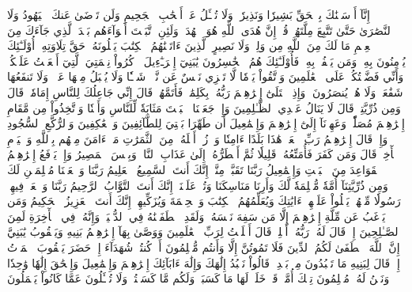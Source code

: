 إِنَّآ أَرۡسَلۡنَٰكَ بِٱلۡحَقِّ بَشِيرٗا وَنَذِيرٗاۖ وَلَا تُسۡـَٔلُ عَنۡ أَصۡحَٰبِ ٱلۡجَحِيمِ
وَلَن تَرۡضَىٰ عَنكَ ٱلۡيَهُودُ وَلَا ٱلنَّصَٰرَىٰ حَتَّىٰ تَتَّبِعَ مِلَّتَهُمۡۗ قُلۡ إِنَّ هُدَى ٱللَّهِ هُوَ ٱلۡهُدَىٰۗ وَلَئِنِ ٱتَّبَعۡتَ أَهۡوَآءَهُم بَعۡدَ ٱلَّذِي جَآءَكَ مِنَ ٱلۡعِلۡمِ مَا لَكَ مِنَ ٱللَّهِ مِن وَلِيّٖ وَلَا نَصِيرٍ
ٱلَّذِينَ ءَاتَيۡنَٰهُمُ ٱلۡكِتَٰبَ يَتۡلُونَهُۥ حَقَّ تِلَاوَتِهِۦٓ أُوْلَـٰٓئِكَ يُؤۡمِنُونَ بِهِۦۗ وَمَن يَكۡفُرۡ بِهِۦ فَأُوْلَـٰٓئِكَ هُمُ ٱلۡخَٰسِرُونَ
يَٰبَنِيٓ إِسۡرَـٰٓءِيلَ ٱذۡكُرُواْ نِعۡمَتِيَ ٱلَّتِيٓ أَنۡعَمۡتُ عَلَيۡكُمۡ وَأَنِّي فَضَّلۡتُكُمۡ عَلَى ٱلۡعَٰلَمِينَ
وَٱتَّقُواْ يَوۡمٗا لَّا تَجۡزِي نَفۡسٌ عَن نَّفۡسٖ شَيۡـٔٗا وَلَا يُقۡبَلُ مِنۡهَا عَدۡلٞ وَلَا تَنفَعُهَا شَفَٰعَةٞ وَلَا هُمۡ يُنصَرُونَ
۞وَإِذِ ٱبۡتَلَىٰٓ إِبۡرَٰهِـۧمَ رَبُّهُۥ بِكَلِمَٰتٖ فَأَتَمَّهُنَّۖ قَالَ إِنِّي جَاعِلُكَ لِلنَّاسِ إِمَامٗاۖ قَالَ وَمِن ذُرِّيَّتِيۖ قَالَ لَا يَنَالُ عَهۡدِي ٱلظَّـٰلِمِينَ
وَإِذۡ جَعَلۡنَا ٱلۡبَيۡتَ مَثَابَةٗ لِّلنَّاسِ وَأَمۡنٗا وَٱتَّخِذُواْ مِن مَّقَامِ إِبۡرَٰهِـۧمَ مُصَلّٗىۖ وَعَهِدۡنَآ إِلَىٰٓ إِبۡرَٰهِـۧمَ وَإِسۡمَٰعِيلَ أَن طَهِّرَا بَيۡتِيَ لِلطَّآئِفِينَ وَٱلۡعَٰكِفِينَ وَٱلرُّكَّعِ ٱلسُّجُودِ
وَإِذۡ قَالَ إِبۡرَٰهِـۧمُ رَبِّ ٱجۡعَلۡ هَٰذَا بَلَدًا ءَامِنٗا وَٱرۡزُقۡ أَهۡلَهُۥ مِنَ ٱلثَّمَرَٰتِ مَنۡ ءَامَنَ مِنۡهُم بِٱللَّهِ وَٱلۡيَوۡمِ ٱلۡأٓخِرِۚ قَالَ وَمَن كَفَرَ فَأُمَتِّعُهُۥ قَلِيلٗا ثُمَّ أَضۡطَرُّهُۥٓ إِلَىٰ عَذَابِ ٱلنَّارِۖ وَبِئۡسَ ٱلۡمَصِيرُ
وَإِذۡ يَرۡفَعُ إِبۡرَٰهِـۧمُ ٱلۡقَوَاعِدَ مِنَ ٱلۡبَيۡتِ وَإِسۡمَٰعِيلُ رَبَّنَا تَقَبَّلۡ مِنَّآۖ إِنَّكَ أَنتَ ٱلسَّمِيعُ ٱلۡعَلِيمُ
رَبَّنَا وَٱجۡعَلۡنَا مُسۡلِمَيۡنِ لَكَ وَمِن ذُرِّيَّتِنَآ أُمَّةٗ مُّسۡلِمَةٗ لَّكَ وَأَرِنَا مَنَاسِكَنَا وَتُبۡ عَلَيۡنَآۖ إِنَّكَ أَنتَ ٱلتَّوَّابُ ٱلرَّحِيمُ
رَبَّنَا وَٱبۡعَثۡ فِيهِمۡ رَسُولٗا مِّنۡهُمۡ يَتۡلُواْ عَلَيۡهِمۡ ءَايَٰتِكَ وَيُعَلِّمُهُمُ ٱلۡكِتَٰبَ وَٱلۡحِكۡمَةَ وَيُزَكِّيهِمۡۖ إِنَّكَ أَنتَ ٱلۡعَزِيزُ ٱلۡحَكِيمُ
وَمَن يَرۡغَبُ عَن مِّلَّةِ إِبۡرَٰهِـۧمَ إِلَّا مَن سَفِهَ نَفۡسَهُۥۚ وَلَقَدِ ٱصۡطَفَيۡنَٰهُ فِي ٱلدُّنۡيَاۖ وَإِنَّهُۥ فِي ٱلۡأٓخِرَةِ لَمِنَ ٱلصَّـٰلِحِينَ
إِذۡ قَالَ لَهُۥ رَبُّهُۥٓ أَسۡلِمۡۖ قَالَ أَسۡلَمۡتُ لِرَبِّ ٱلۡعَٰلَمِينَ
وَوَصَّىٰ بِهَآ إِبۡرَٰهِـۧمُ بَنِيهِ وَيَعۡقُوبُ يَٰبَنِيَّ إِنَّ ٱللَّهَ ٱصۡطَفَىٰ لَكُمُ ٱلدِّينَ فَلَا تَمُوتُنَّ إِلَّا وَأَنتُم مُّسۡلِمُونَ
أَمۡ كُنتُمۡ شُهَدَآءَ إِذۡ حَضَرَ يَعۡقُوبَ ٱلۡمَوۡتُ إِذۡ قَالَ لِبَنِيهِ مَا تَعۡبُدُونَ مِنۢ بَعۡدِيۖ قَالُواْ نَعۡبُدُ إِلَٰهَكَ وَإِلَٰهَ ءَابَآئِكَ إِبۡرَٰهِـۧمَ وَإِسۡمَٰعِيلَ وَإِسۡحَٰقَ إِلَٰهٗا وَٰحِدٗا وَنَحۡنُ لَهُۥ مُسۡلِمُونَ
تِلۡكَ أُمَّةٞ قَدۡ خَلَتۡۖ لَهَا مَا كَسَبَتۡ وَلَكُم مَّا كَسَبۡتُمۡۖ وَلَا تُسۡـَٔلُونَ عَمَّا كَانُواْ يَعۡمَلُونَ
